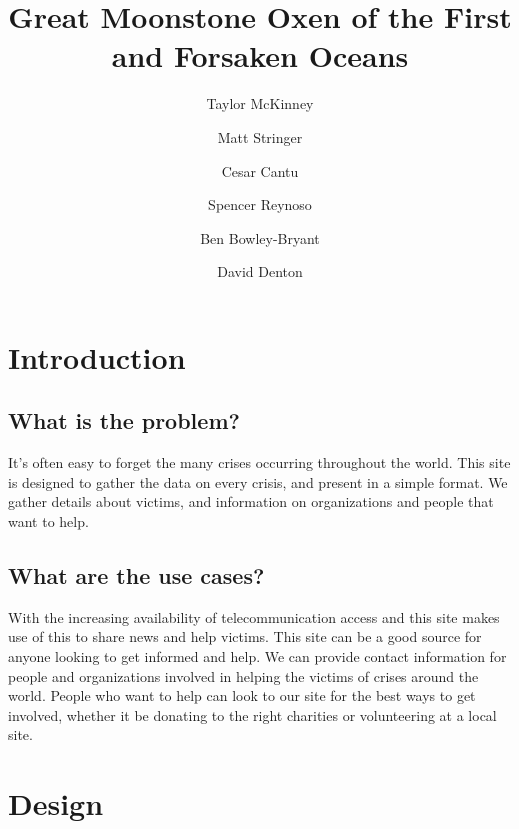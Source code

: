 \documentclass{article}
\title{Great Moonstone Oxen of the First and Forsaken Oceans}
\author{
    Taylor McKinney
    \and Matt Stringer
    \and Cesar Cantu
    \and Spencer Reynoso
    \and Ben Bowley-Bryant
    \and David Denton}
\begin{document}
\maketitle

\section*{Introduction}
\subsection*{What is the problem?}
It's often easy to forget the many crises occurring throughout the world.
This site is designed to gather the data on every crisis, and present in a simple format.
We gather details about victims, and information on organizations and people that want to help.

\subsection*{What are the use cases?}
With the increasing availability of telecommunication access and this site makes use of this to share news and help victims.
This site can be a good source for anyone looking to get informed and help. 
We can provide contact information for people and organizations involved in helping the victims of crises around the world.
People who want to help can look to our site for the best ways to get involved, whether it be donating to the right charities or volunteering at a local site.

\newpage
\section*{Design}
\end{document}
